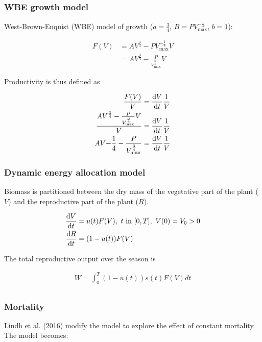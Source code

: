 \documentclass[12pt, oneside]{article}   	%
\begin{document}
\subsubsection{WBE growth model}

\noindent West-Brown-Enquist (WBE) model of growth ($a=\frac{3}{4}$, $B=P V_\text{max}^{-\frac{1}{4}}$, $b=1$):

\begin{align}
F(V) & = AV^\frac{3}{4} - P V_\text{max}^{-\frac{1}{4}} V \\
& =  AV^\frac{3}{4} - \frac{P}{ V_\text{max}^{\frac{3}{4}} } V 
\end{align}

Productivity is thus defined as

\begin{align}
\frac{F(V)}{V} & = \dv{V}{t} \frac{1}{V} \nonumber \\
\frac{AV^\frac{3}{4} - \frac{P}{ V_\text{max}^{\frac{3}{4}} } V }{V} & = \dv{V}{t} \frac{1}{V} \nonumber \\
AV{-\frac{1}{4}} - \frac{P}{ V_\text{max}^{\frac{3}{4}} }   & = \dv{V}{t} \frac{1}{V} \nonumber \\
\end{align}

\subsubsection{Dynamic energy allocation model}

Biomass is partitioned between the dry mass of the vegetative part of the plant ($V$) and the reproductive part of the plant ($R$).

\begin{align}
\dv{V}{t} & = u(t) F(V),\ t\mathrm{\ in\ }[0,T],\ V(0)=V_0>0  \\
\dv{R}{t} & = (1-u(t)) F(V) 
\end{align}

The total reproductive output over the season is

\begin{align}
W =  \int_0^T (1-u(t)) s(t)  F(V) dt  \nonumber \\
\end{align}

\subsubsection{Mortality}

Lindh et al. (2016) modify the model to explore the effect of constant mortality. The model becomes:
\end{document}
